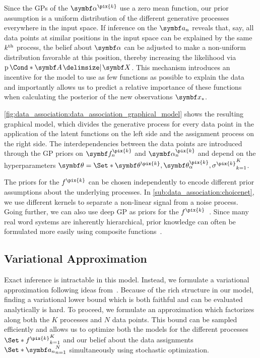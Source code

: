 Since the GPs of the $\mat{\alpha^{\pix{k}}}$ use a zero mean function, our prior assumption is a uniform distribution of the different generative processes everywhere in the input space.
If inference on the $\mat{a_n}$ reveals that, say, all data points at similar positions in the input space can be explained by the same $k^{\text{th}}$ process, the belief about $\mat{\alpha}$ can be adjusted to make a non-uniform distribution favorable at this position, thereby increasing the likelihood via $\Prob*{\mat{A} \given \mat{X}}$.
This mechanism introduces an incentive for the model to use as few functions as possible to explain the data and importantly allows us to predict a relative importance of these functions when calculating the posterior of the new observations $\mat{x_\ast}$.

\cref{fig:data_association:data_association_graphical_model} shows the resulting graphical model, which divides the generative process for every data point in the application of the latent functions on the left side and the assignment process on the right side.
The interdependencies between the data points are introduced through the GP priors on $\rv{f_n^{\pix{k}}}$ and $\rv{\alpha_n^{\pix{k}}}$ and depend on the hyperparameters $\mat{\theta} = \Set*{\mat{\theta^{\pix{k}}}, \mat{\theta_\alpha^{\pix{k}}}, \sigma^{\pix{k}}}_{k=1}^K$.

The priors for the $f^{\pix{k}}$ can be chosen independently to encode different prior assumptions about the underlying processes.
In \cref{sub:data_association:choicenet}, we use different kernels to separate a non-linear signal from a noise process.
Going further, we can also use deep GP as priors for the $f^{\pix{k}}$~\parencite{damianou_deep_2013, salimbeni_doubly_2017}.
Since many real word systems are inherently hierarchical, prior knowledge can often be formulated more easily using composite functions~\parencite{kaiser_bayesian_2018}.


\subsection{Variational Approximation}
\label{sub:data_association:variational_approximation}
Exact inference is intractable in this model.
Instead, we formulate a variational approximation following ideas from~\parencite{hensman_gaussian_2013, salimbeni_doubly_2017}.
Because of the rich structure in our model, finding a variational lower bound which is both faithful and can be evaluated analytically is hard.
To proceed, we formulate an approximation which factorizes along both the $K$ processes and $N$ data points.
This bound can be sampled efficiently and allows us to optimize both the models for the different processes $\Set*{f^{\pix{k}}}_{k=1}^K$ and our belief about the data assignments $\Set*{\mat{a_n}}_{n=1}^N$ simultaneously using stochastic optimization.

